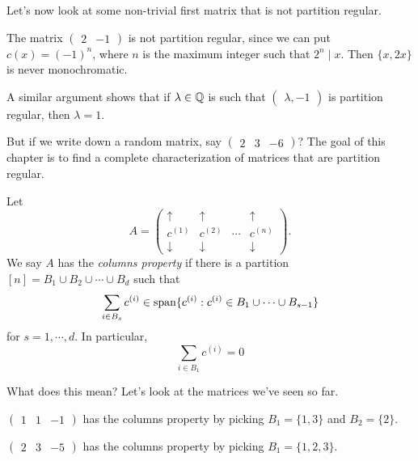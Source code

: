 \documentclass[a4paper]{article}
\begin{document}
  Let's now look at some non-trivial first matrix that is not partition regular.
  \begin{eg}
    The matrix $\begin{pmatrix}2 & -1\end{pmatrix}$ is not partition regular, since we can put $c(x) = (-1)^n$, where $n$ is the maximum integer such that $2^n \mid x$. Then $\{x, 2x\}$ is never monochromatic.

    A similar argument shows that if $\lambda \in \mathbb{Q}$ is such that $\begin{pmatrix}\lambda, -1\end{pmatrix}$ is partition regular, then $\lambda = 1$.
  \end{eg}
  But if we write down a random matrix, say $\begin{pmatrix}2 & 3 & -6\end{pmatrix}$? The goal of this chapter is to find a complete characterization of matrices that are partition regular.

  \begin{defi}
    Let
    \[
      A =
      \begin{pmatrix}
        \uparrow & \uparrow & & \uparrow\\
        c^{(1)} & c^{(2)} & \cdots & c^{(n)}\\
        \downarrow & \downarrow & & \downarrow
      \end{pmatrix}.
    \]
    We say $A$ has the \emph{columns property} if there is a partition $[n] = B_1 \cup B_2 \cup \cdots \cup B_d$ such that
    \[
      \sum_{i \in B_s} c^{(i)} \in \operatorname{span}\{c^{(i)} : c^{(i)} \in B_1 \cup \cdots \cup B_{s - 1}\}
    \]
    for $s = 1, \cdots, d$. In particular,
    \[
      \sum_{i \in B_1} c^{(i)} = 0
    \]
  \end{defi}
  What does this mean? Let's look at the matrices we've seen so far.
  \begin{eg}
    $\begin{pmatrix}1 & 1 & -1\end{pmatrix}$ has the columns property by picking $B_1 = \{1, 3\}$ and $B_2 = \{2\}$.
  \end{eg}

  \begin{eg}
    $\begin{pmatrix}2 & 3 & -5\end{pmatrix}$ has the columns property by picking $B_1 = \{1, 2, 3\}$.
  \end{eg}
\end{document}

